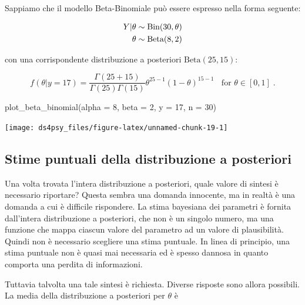 \documentclass[
  11pt,
]{krantz}
\makeatletter
\newenvironment{Shaded}{\begin{snugshade}}{\end{snugshade}}
\newcommand{\AttributeTok}[1]{\textcolor[rgb]{0.61,0.61,0.61}{#1}}
\newcommand{\DecValTok}[1]{\textcolor[rgb]{0.06,0.06,0.06}{#1}}
\newcommand{\FunctionTok}[1]{\textcolor[rgb]{0,0,0}{#1}}
\newcommand{\NormalTok}[1]{#1}
\newenvironment{kframe}{%
\medskip{}
\setlength{\fboxsep}{.8em}
 \def\at@end@of@kframe{}%
 \ifinner\ifhmode%
  \def\at@end@of@kframe{\end{minipage}}%
  \begin{minipage}{\columnwidth}%
 \fi\fi%
 \def\FrameCommand##1{\hskip\@totalleftmargin \hskip-\fboxsep
 \colorbox{shadecolor}{##1}\hskip-\fboxsep
     \hskip-\linewidth \hskip-\@totalleftmargin \hskip\columnwidth}%
 \MakeFramed {\advance\hsize-\width
   \@totalleftmargin\z@ \linewidth\hsize
   \@setminipage}}%
 {\par\unskip\endMakeFramed%
 \at@end@of@kframe}
\renewenvironment{Shaded}{\begin{kframe}}{\end{kframe}}
\theoremstyle{definition}
\theoremstyle{definition}
\theoremstyle{definition}
\theoremstyle{definition}
\theoremstyle{remark}
\makeatother
\begin{document}
Sappiamo che il modello Beta-Binomiale può essere espresso nella forma seguente:

\begin{align}
Y | \theta & \sim \mbox{Bin}(30, \theta) \notag\\
\theta & \sim \mbox{Beta}(8, 2) \notag
\end{align}

con una corrispondente distribuzione a posteriori \(\mbox{Beta}(25, 15)\):

\begin{equation}
f(\theta | y = 17) = \frac{\Gamma(25 + 15)}{\Gamma(25)\Gamma(15)}\theta^{25-1} (1-\theta)^{15-1} \;\; \text{ for } \theta \in [0,1] \; .
\label{eq:post-beta-25-15}
\end{equation}

\begin{Shaded}
\begin{Highlighting}[]
\FunctionTok{plot\_beta\_binomial}\NormalTok{(}\AttributeTok{alpha =} \DecValTok{8}\NormalTok{, }\AttributeTok{beta =} \DecValTok{2}\NormalTok{, }\AttributeTok{y =} \DecValTok{17}\NormalTok{, }\AttributeTok{n =} \DecValTok{30}\NormalTok{)}
\end{Highlighting}
\end{Shaded}

\begin{center}\texttt{[image: ds4psy\_files/figure-latex/unnamed-chunk-19-1]} \end{center}

\hypertarget{stime-puntuali-della-distribuzione-a-posteriori}{%
\subsection{Stime puntuali della distribuzione a posteriori}\label{stime-puntuali-della-distribuzione-a-posteriori}}

Una volta trovata l'intera distribuzione a posteriori, quale valore di sintesi è necessario riportare? Questa sembra una domanda innocente, ma in realtà è una domanda a cui è difficile rispondere. La stima bayesiana dei parametri è fornita dall'intera distribuzione a posteriori, che non è un singolo numero, ma una funzione che mappa ciascun valore del parametro ad un valore di plausibilità. Quindi non è necessario scegliere una stima puntuale. In linea di principio, una stima puntuale non è quasi mai necessaria ed è spesso dannosa in quanto comporta una perdita di informazioni.

Tuttavia talvolta una tale sintesi è richiesta. Diverse risposte sono allora possibili. La media della distribuzione a posteriori per \(\theta\) è
\end{document}
